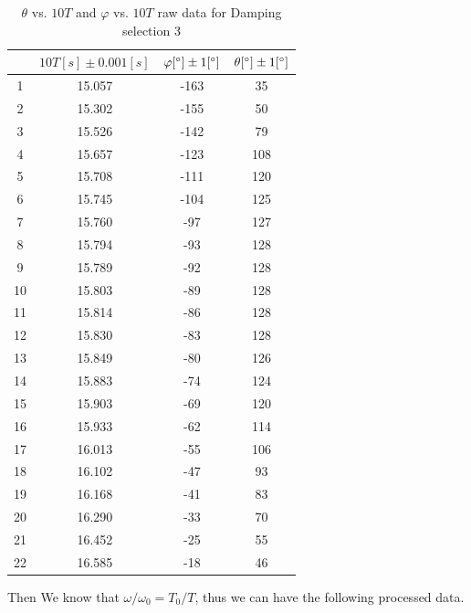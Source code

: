 \begin{table}[H]
\centering
\begin{tabular}{|c|c|c|c|}
\hline
& $10T [s] \pm 0.001 [s]$ &  $\varphi  [^\circ]  \pm 1 [^\circ]$ & $ \theta [^\circ] \pm 1 [^\circ]$ \\ \hline

1  & 15.057   & -163 &  35   \\ \hline
2  & 15.302   & -155 &  50   \\ \hline
3  & 15.526   & -142 &  79   \\ \hline
4  & 15.657   & -123 &  108  \\ \hline
5  & 15.708   & -111 &  120  \\ \hline
6  & 15.745   & -104 &  125  \\ \hline
7  & 15.760   & -97  &  127  \\ \hline
8  & 15.794   & -93  &  128  \\ \hline
9  & 15.789   & -92  &  128  \\ \hline
10 & 15.803   & -89  &  128  \\ \hline
11 & 15.814   & -86  &  128  \\ \hline
12 & 15.830   & -83  &  128  \\ \hline
13 & 15.849   & -80  &  126  \\ \hline
14 & 15.883   & -74  &  124  \\ \hline
15 & 15.903   & -69  &  120  \\ \hline
16 & 15.933   & -62  &  114  \\ \hline
17 & 16.013   & -55  &  106  \\ \hline
18 & 16.102   & -47  &  93   \\ \hline
19 & 16.168   & -41  &  83   \\ \hline
20 & 16.290   & -33  &  70   \\ \hline
21 & 16.452   & -25  &  55   \\ \hline
22 & 16.585   & -18  &  46   \\ \hline
\end{tabular}    
\caption{$\theta$ vs. $10T$ and $\varphi$ vs. $10T$ raw data for Damping
  selection 3} 
\end{table}


Then We know that $ \omega / \omega_0 = T_0 / T $,
thus we can have the following processed data.


